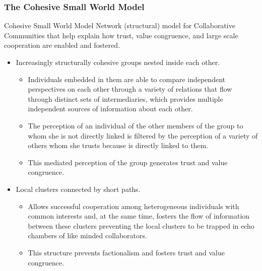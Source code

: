 \documentclass[ignorenonframetext,red,8pt,notes=hide]{beamer}
\begin{document}
\begin{frame}
\frametitle{The Cohesive Small World Model}

\begin{block}{Cohesive Small World Model}
Network (structural) model for Collaborative Communities that help explain how trust, value congruence, and large scale cooperation are enabled and fostered.

\begin{itemize}
\item Increasingly structurally cohesive groups nested inside each other.
\begin{itemize}
\item Individuals embedded in them are able to compare independent perspectives on each other through a variety of relations that flow through distinct sets of intermediaries, which provides multiple independent sources of information about each other.
\item The perception of an individual of the other members of the group to whom she is not directly linked is filtered by the perception of a variety of others whom she trusts because is directly linked to them. 
\item This mediated perception of the group generates trust and value congruence. 
\end{itemize}

\item Local clusters connected by short paths.
\begin{itemize}
\item Allows successful cooperation among heterogeneous individuals with common interests and, at the same time, fosters the flow of information between these clusters preventing the local clusters to be trapped in echo chambers of like minded collaborators.
\item This structure prevents factionalism and fosters trust and value congruence.
\end{itemize}

\end{itemize}
\end{block}



\end{frame}
\end{document}
